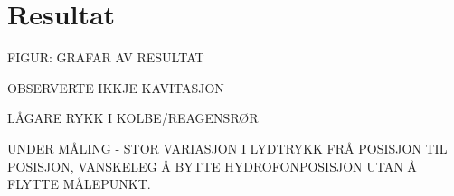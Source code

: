 \section{Resultat}
FIGUR: GRAFAR AV RESULTAT

OBSERVERTE IKKJE KAVITASJON

LÅGARE RYKK I KOLBE/REAGENSRØR

UNDER MÅLING - STOR VARIASJON I LYDTRYKK FRÅ POSISJON TIL POSISJON, VANSKELEG Å BYTTE HYDROFONPOSISJON UTAN Å FLYTTE MÅLEPUNKT.

